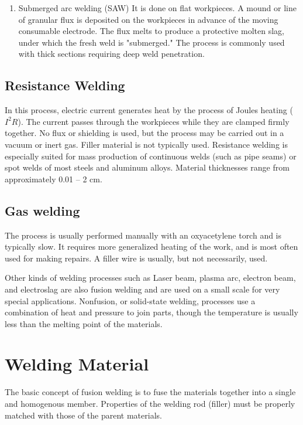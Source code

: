 \documentclass[a4paper,openany,12pt]{book}
\begin{document}
{{\begin{enumerate}
\item Submerged arc welding (SAW)
\label{sec:orgab2495d}
It is done on flat workpieces. A mound or line of granular flux is
deposited on the workpieces in advance of the moving consumable
electrode. The flux melts to produce a protective molten slag, under
which the fresh weld is "submerged." The process is commonly used with
thick sections requiring deep weld penetration.
\end{enumerate}

\subsection{Resistance Welding}
\label{sec:org679d8c2}
In this process, electric current generates heat by the process of
Joules heating (\(I^2R\)). The current passes through the workpieces while
they are clamped firmly together. No flux or shielding is used, but the
process may be carried out in a vacuum or inert gas. Filler material is
not typically used. Resistance welding is especially suited for mass
production of continuous welds (such as pipe seams) or spot welds of
most steels and aluminum alloys. Material thicknesses range from
approximately 0.01 -- 2 cm.

\subsection{Gas welding}
\label{sec:org6610fc8}
The process is usually performed manually with an oxyacetylene torch and
is typically slow. It requires more generalized heating of the work, and
is most often used for making repairs. A filler wire is usually, but not
necessarily, used.

Other kinds of welding processes such as Laser beam, plasma arc,
electron beam, and electroslag are also fusion welding and are used on a
small scale for very special applications. Nonfusion, or solid-state
welding, processes use a combination of heat and pressure to join parts,
though the temperature is usually less than the melting point of the
materials.

\section{Welding Material}
\label{sec:orgb9fb6ab}
The basic concept of fusion welding is to fuse the materials together
into a single and homogenous member. Properties of the welding rod
(filler) must be properly matched with those of the parent materials.

}}
\end{document}
